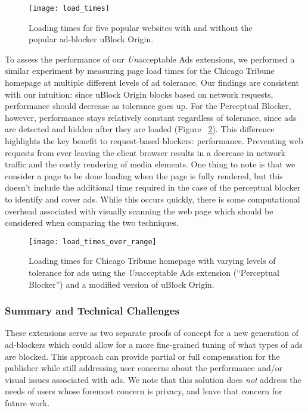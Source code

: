 \begin{figure}[h]
\centering
\texttt{[image: load\_times]}
\caption{Loading times for five popular websites with and without the popular ad-blocker uBlock Origin.}
\label{fig:load_times}
\end{figure}

To assess the performance of our \textit{Un}acceptable Ads extensions, we performed a similar experiment by measuring page load times for the Chicago Tribune homepage at multiple different levels of ad tolerance.
Our findings are consistent with our intuition: since uBlock Origin blocks based on network requests, performance should decrease as tolerance goes up.
For the Perceptual Blocker, however, performance stays relatively constant regardless of tolerance, since ads are detected and hidden after they are loaded (Figure ~\ref{fig:load_times_over_range}).
This difference highlights the key benefit to request-based blockers: performance.
Preventing web requests from ever leaving the client browser results in a decrease in network traffic and the costly rendering of media elements.
One thing to note is that we consider a page to be done loading when the page is fully rendered, but this doesn't include the additional time required in the case of the perceptual blocker to identify and cover ads.
While this occurs quickly, there is some computational overhead associated with visually scanning the web page which should be considered when comparing the two techniques.

\begin{figure}[h]
\centering
\texttt{[image: load\_times\_over\_range]}
\caption{Loading times for Chicago Tribune homepage with varying levels of tolerance for ads using the \textit{Un}acceptable Ads extension (``Perceptual Blocker'') and a modified version of uBlock Origin.}
\label{fig:load_times_over_range}
\end{figure}

\subsubsection{Summary and Technical Challenges}
These extensions serve as two separate proofs of concept for a new generation of ad-blockers which could allow for a more fine-grained tuning of what types of ads are blocked.
This approach can provide partial or full compensation for the publisher while still addressing user concerns about the performance and/or visual issues associated with ads.
We note that this solution does \textit{not} address the needs of users whose foremost concern is privacy, and leave that concern for future work.

